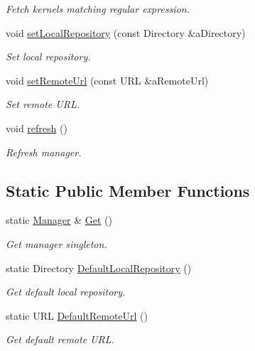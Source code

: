 \begin{DoxyCompactItemize}
\begin{DoxyCompactList}\small\item\em Fetch kernels matching regular expression. \end{DoxyCompactList}\item 
void \hyperlink{classlibrary_1_1physics_1_1env_1_1ephem_1_1spice_1_1_manager_a98450d702f95a67b53fe3f08ba6e8625}{set\+Local\+Repository} (const Directory \&a\+Directory)
\begin{DoxyCompactList}\small\item\em Set local repository. \end{DoxyCompactList}\item 
void \hyperlink{classlibrary_1_1physics_1_1env_1_1ephem_1_1spice_1_1_manager_acddf543ad7c3ba467311166dc2192458}{set\+Remote\+Url} (const U\+RL \&a\+Remote\+Url)
\begin{DoxyCompactList}\small\item\em Set remote U\+RL. \end{DoxyCompactList}\item 
void \hyperlink{classlibrary_1_1physics_1_1env_1_1ephem_1_1spice_1_1_manager_ae09ea8ee9bb108497fad079308d9becd}{refresh} ()
\begin{DoxyCompactList}\small\item\em Refresh manager. \end{DoxyCompactList}\end{DoxyCompactItemize}
\subsection*{Static Public Member Functions}
\begin{DoxyCompactItemize}
\item 
static \hyperlink{classlibrary_1_1physics_1_1env_1_1ephem_1_1spice_1_1_manager}{Manager} \& \hyperlink{classlibrary_1_1physics_1_1env_1_1ephem_1_1spice_1_1_manager_a3555b4555090b1140f1041d7e51ad640}{Get} ()
\begin{DoxyCompactList}\small\item\em Get manager singleton. \end{DoxyCompactList}\item 
static Directory \hyperlink{classlibrary_1_1physics_1_1env_1_1ephem_1_1spice_1_1_manager_afe6536dede2bc35e76a01ba12a203eb5}{Default\+Local\+Repository} ()
\begin{DoxyCompactList}\small\item\em Get default local repository. \end{DoxyCompactList}\item 
static U\+RL \hyperlink{classlibrary_1_1physics_1_1env_1_1ephem_1_1spice_1_1_manager_ae15505efd208b9e43550692f7620d40e}{Default\+Remote\+Url} ()
\begin{DoxyCompactList}\small\item\em Get default remote U\+RL. \end{DoxyCompactList}\end{DoxyCompactItemize}


